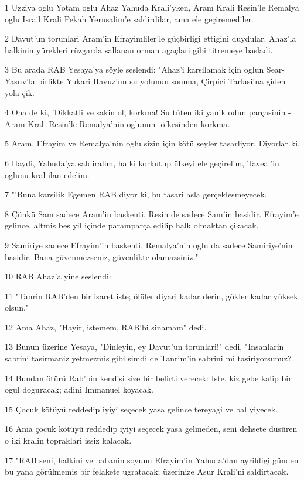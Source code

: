\par 1 Uzziya oglu Yotam oglu Ahaz Yahuda Krali'yken, Aram Krali Resin'le Remalya oglu Israil Krali Pekah Yerusalim'e saldirdilar, ama ele geçiremediler.
\par 2 Davut'un torunlari Aram'in Efrayimliler'le güçbirligi ettigini duydular. Ahaz'la halkinin yürekleri rüzgarda sallanan orman agaçlari gibi titremeye basladi.
\par 3 Bu arada RAB Yesaya'ya söyle seslendi: "Ahaz'i karsilamak için oglun Sear-Yasuv'la birlikte Yukari Havuz'un su yolunun sonuna, Çirpici Tarlasi'na giden yola çik.
\par 4 Ona de ki, 'Dikkatli ve sakin ol, korkma! Su tüten iki yanik odun parçasinin -Aram Krali Resin'le Remalya'nin oglunun- öfkesinden korkma.
\par 5 Aram, Efrayim ve Remalya'nin oglu sizin için kötü seyler tasarliyor. Diyorlar ki,
\par 6 Haydi, Yahuda'ya saldiralim, halki korkutup ülkeyi ele geçirelim, Taveal'in oglunu kral ilan edelim.
\par 7 "'Buna karsilik Egemen RAB diyor ki, bu tasari asla gerçeklesmeyecek.
\par 8 Çünkü Sam sadece Aram'in baskenti, Resin de sadece Sam'in basidir. Efrayim'e gelince, altmis bes yil içinde paramparça edilip halk olmaktan çikacak.
\par 9 Samiriye sadece Efrayim'in baskenti, Remalya'nin oglu da sadece Samiriye'nin basidir. Bana güvenmezseniz, güvenlikte olamazsiniz."
\par 10 RAB Ahaz'a yine seslendi:
\par 11 "Tanrin RAB'den bir isaret iste; ölüler diyari kadar derin, gökler kadar yüksek olsun."
\par 12 Ama Ahaz, "Hayir, istemem, RAB'bi sinamam" dedi.
\par 13 Bunun üzerine Yesaya, "Dinleyin, ey Davut'un torunlari!" dedi, "Insanlarin sabrini tasirmaniz yetmezmis gibi simdi de Tanrim'in sabrini mi tasiriyorsunuz?
\par 14 Bundan ötürü Rab'bin kendisi size bir belirti verecek: Iste, kiz gebe kalip bir ogul doguracak; adini Immanuel koyacak.
\par 15 Çocuk kötüyü reddedip iyiyi seçecek yasa gelince tereyagi ve bal yiyecek.
\par 16 Ama çocuk kötüyü reddedip iyiyi seçecek yasa gelmeden, seni dehsete düsüren o iki kralin topraklari issiz kalacak.
\par 17 "RAB seni, halkini ve babanin soyunu Efrayim'in Yahuda'dan ayrildigi günden bu yana görülmemis bir felakete ugratacak; üzerinize Asur Krali'ni saldirtacak.
